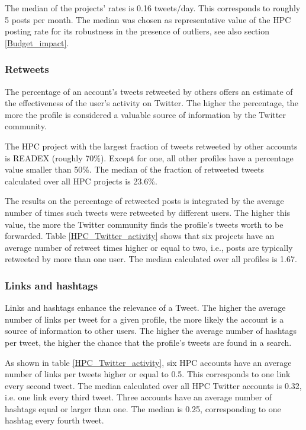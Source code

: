 The median of the projects' rates is 0.16 tweets/day. This corresponds to roughly 5 posts per month. The median was chosen as representative value of the HPC posting rate for its robustness in the presence of outliers, see also section \ref{Budget_impact}.

\subsubsection{Retweets}
The percentage of an account's tweets retweeted by others offers an estimate of the effectiveness of the user's  activity on Twitter. The higher the percentage, the more the profile is considered a valuable source of information by the Twitter community. 

The HPC project with the largest fraction of tweets retweeted by other accounts is READEX (roughly 70\%). Except for one, all other profiles have a percentage value smaller than 50\%. The median of the fraction of retweeted tweets calculated over all HPC projects is 23.6\%.

The results on the percentage of retweeted posts is integrated by the average number of times such tweets were retweeted by different users. The higher this value, the more the Twitter community finds the profile's tweets worth to be forwarded. Table \ref{HPC_Twitter_activity} shows that six projects have an average number of retweet times higher or equal to two, i.e., posts are typically retweeted by more than one user. The median calculated over all profiles is 1.67.

\subsubsection{Links and hashtags}
Links and hashtags enhance the relevance of a Tweet. The higher the average number of links per tweet for a given profile, the more likely the account is a source of information to other users. The higher the average number of hashtags per tweet, the higher the chance that the profile's tweets are found in a search.

As shown in table \ref{HPC_Twitter_activity}, six HPC accounts have an average number of links per tweets higher or equal to 0.5. This corresponds to one link every second tweet. The median calculated over all HPC Twitter accounts is 0.32, i.e. one link every third tweet. Three accounts have an average number of hashtags equal or larger than one. The median is 0.25, corresponding to one hashtag every fourth tweet.

